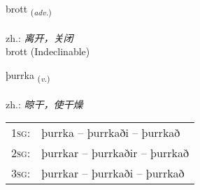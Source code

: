 \documentclass[frontgrid, backgrid]{flacards}\usepackage[]{graphicx}\usepackage[]{xcolor}
\begin{document}

\renewcommand{\flhead}{\vskip5pt \fboxsep=0pt {\small\bfseries\footnotesize Atviksorð | 副词}}
\renewcommand{\fcfoot}{\vskip5pt \fboxsep=0pt \hspace{2pt}{\small\bfseries\footnotesize 3K}}

\renewcommand{\blhead}{\vskip5pt {\small\bfseries\footnotesize Atviksorð | 副词 }}
\renewcommand{\bcfoot}{\vskip5pt \hspace{2pt}{\small\bfseries\footnotesize 3K}}


{brott \small{\textsubscript{(\textit{adv.})}} \\[1ex]
\textphonetic{[prɔht]} \\
zh.: \emph{离开，关闭} \\  [2ex]
brott (Indeclinable)}

\renewcommand{\flhead}{\vskip5pt \fboxsep=0pt {\small\bfseries\footnotesize Sagnorð | 动词}}
\renewcommand{\fcfoot}{\vskip5pt \fboxsep=0pt \hspace{2pt}{\small\bfseries\footnotesize 3K}}

\renewcommand{\blhead}{\vskip5pt {\small\bfseries\footnotesize Sagnorð | 动词 }}
\renewcommand{\bcfoot}{\vskip5pt \hspace{2pt}{\small\bfseries\footnotesize 3K}}


{þurrka \small{\textsubscript{(\textit{v.})}} \\[1ex] %
\textphonetic{[θʏr̥ka]} \\
zh.: \emph{晾干，使干燥} \\  [2ex]
\renewcommand*{\arraystretch}{0.8}
\begin{tabular}{p{1cm}l}
\textsc{1sg}: & þurrka -- þurrkaði -- þurrkað \\ 
\textsc{2sg}: & þurrkar -- þurrkaðir -- þurrkað \\ 
\textsc{3sg}: & þurrkar -- þurrkaði -- þurrkað \\ 
\end{tabular}
}

\renewcommand{\flhead}{\vskip5pt \fboxsep=0pt {\small\bfseries\footnotesize Sagnorð | 动词}}
\renewcommand{\fcfoot}{\vskip5pt \fboxsep=0pt \hspace{2pt}{\small\bfseries\footnotesize 3K}}
\end{document}
